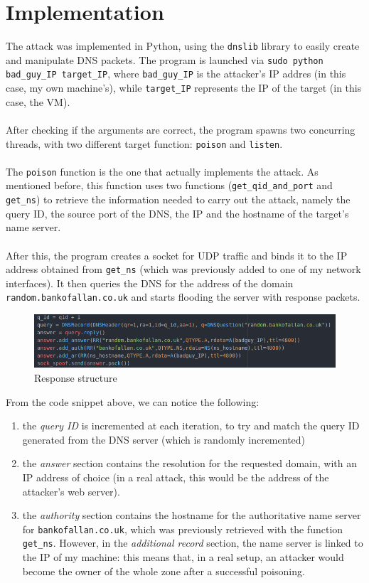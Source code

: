 \documentclass[a4paper]{article}
\begin{document}
\section{Implementation}
	The attack was implemented in Python, using the \texttt{dnslib} library to easily create and manipulate DNS packets. The program is launched via \texttt{sudo python bad\_guy\_IP target\_IP}, where \texttt{bad\_guy\_IP} is the attacker's IP addres (in this case, my own machine's), while \texttt{target\_IP} represents the IP of the target (in this case, the VM).\\
	\\After checking if the arguments are correct, the program spawns two concurring threads, with two different target function: \texttt{poison} and \texttt{listen}.\\
	\\The \texttt{poison} function is the one that actually implements the attack. As mentioned before, this function uses two functions (\texttt{get\_qid\_and\_port} and \texttt{get\_ns}) to retrieve the information needed to carry out the attack, namely the query ID, the source port of the DNS, the IP and the hostname of the target's name server.\\
	\\After this, the program creates a socket for UDP traffic and binds it to the IP address obtained from \texttt{get\_ns} (which was previously added to one of my network interfaces). It then queries the DNS for the address of the domain \texttt{random.bankofallan.co.uk} and starts flooding the server with response packets.
	\begin{figure}[H]
		\centering
		\includegraphics[width=1\linewidth]{response_flooding}
		\caption{Response structure}
		\label{fig:responseflooding}
	\end{figure}
	From the code snippet above, we can notice the following:
	\begin{enumerate}
		\item the \textit{query ID} is incremented at each iteration, to try and match the query ID generated from the DNS server (which is randomly incremented)
		\item the \textit{answer} section contains the resolution for the requested domain, with an IP address of choice (in a real attack, this would be the address of the attacker's web server).
		\item the \textit{authority} section contains the hostname for the authoritative name server for \texttt{bankofallan.co.uk}, which was previously retrieved with the function \texttt{get\_ns}. However, in the \textit{additional record} section, the name server is linked to the IP of my machine: this means that, in a real setup, an attacker would become the owner of the whole zone after a successful poisoning.
	\end{enumerate}
\end{document}
